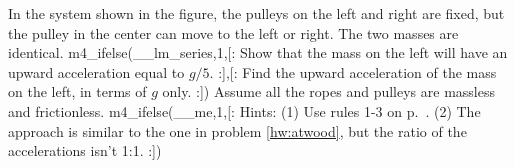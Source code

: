 In the system shown in the figure, the pulleys on the
left and right are fixed, but the pulley in the center can
move to the left or right. The two masses are identical.
m4_ifelse(__lm_series,1,[:%
Show that the mass on the left will have an upward
acceleration equal to $g/5$.
:],[:%
Find the upward acceleration of the mass on the left, in terms of $g$
only.
:]) Assume all the ropes and
pulleys are massless and frictionless.
m4_ifelse(__me,1,[:%
Hints: (1) Use rules 1-3 on p.~\pageref{pulley-rules}.
(2) The approach is similar to the one in problem \ref{hw:atwood},
but the ratio of the accelerations isn't 1:1.\answercheck
:])
